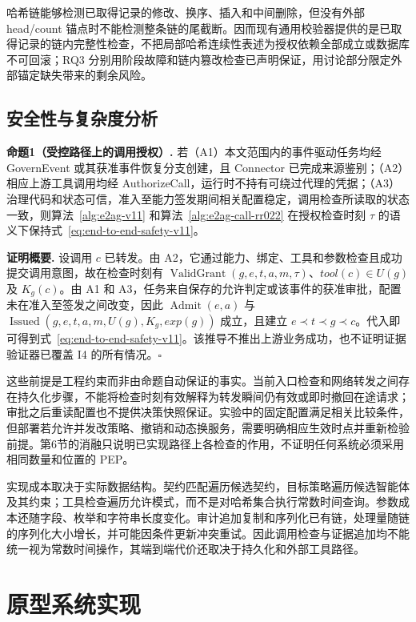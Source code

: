 哈希链能够检测已取得记录的修改、换序、插入和中间删除，但没有外部 head/count 锚点时不能检测整条链的尾截断。因而现有通用校验器提供的是已取得记录的链内完整性检查，不把局部哈希连续性表述为授权依赖全部成立或数据库不可回滚；RQ3 分别用阶段故障和链内篡改检查已声明保证，用讨论部分限定外部锚定缺失带来的剩余风险。

\subsection{安全性与复杂度分析}

\noindent\textbf{命题1（受控路径上的调用授权）.}
若（A1）本文范围内的事件驱动任务均经 GovernEvent 或其获准事件恢复分支创建，且 Connector 已完成来源鉴别；（A2）相应上游工具调用均经 AuthorizeCall，运行时不持有可绕过代理的凭据；（A3）治理代码和状态可信，准入至能力签发期间相关配置稳定，调用检查所读取的状态一致，则算法~\ref{alg:e2ag-v11} 和算法~\ref{alg:e2ag-call-rr022} 在授权检查时刻 $\tau$ 的语义下保持式~\eqref{eq:end-to-end-safety-v11}。

\noindent\textbf{证明概要.}
设调用 $c$ 已转发。由 A2，它通过能力、绑定、工具和参数检查且成功提交调用意图，故在检查时刻有 $\operatorname{ValidGrant}(g,e,t,a,m,\tau)$、$tool(c)\in U(g)$ 及 $K_g(c)$。由 A1 和 A3，任务来自保存的允许判定或该事件的获准审批，配置未在准入至签发之间改变，因此 $\operatorname{Admit}(e,a)$ 与 $\operatorname{Issued}(g,e,t,a,m,U(g),K_g,exp(g))$ 成立，且建立 $e\prec t\prec g\prec c$。代入即可得到式~\eqref{eq:end-to-end-safety-v11}。该推导不推出上游业务成功，也不证明证据验证器已覆盖 I4 的所有情况。\hfill$\square$

这些前提是工程约束而非由命题自动保证的事实。当前入口检查和网络转发之间存在持久化步骤，不能将检查时刻有效解释为转发瞬间仍有效或即时撤回在途请求；审批之后重读配置也不提供决策快照保证。实验中的固定配置满足相关比较条件，但部署若允许并发改策略、撤销和动态换服务，需要明确相应生效时点并重新检验前提。第6节的消融只说明已实现路径上各检查的作用，不证明任何系统必须采用相同数量和位置的 PEP。

实现成本取决于实际数据结构。契约匹配遍历候选契约，目标策略遍历候选智能体及其约束；工具检查遍历允许模式，而不是对哈希集合执行常数时间查询。参数成本还随字段、枚举和字符串长度变化。审计追加复制和序列化已有链，处理量随链的序列化大小增长，并可能因条件更新冲突重试。因此调用检查与证据追加均不能统一视为常数时间操作，其端到端代价还取决于持久化和外部工具路径。

\section{原型系统实现}\label{sec:implementation-v11}

